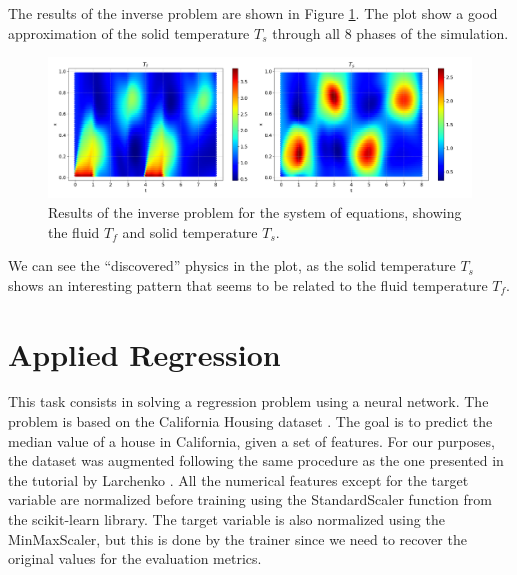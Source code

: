 \documentclass[unicode,11pt,a4paper,oneside,numbers=endperiod,openany]{scrartcl}
\begin{document}
The results of the inverse problem are shown in Figure \ref{fig:task2}. The plot
show a good approximation of the solid temperature $T_s$ through all 8 phases of
the simulation.
\begin{figure}[h]
    \centering
    \includegraphics[width=\textwidth]{../Proj1_Y24/Task2/output.png}
    \caption{Results of the inverse problem for the system of equations, showing the fluid  $T_f$ and solid temperature $T_s$.}
    \label{fig:task2}
\end{figure}
We can see the ``discovered'' physics in the plot, as the solid temperature
$T_s$
shows an interesting pattern that seems to be related to the fluid temperature
$T_f$.

\section{Applied Regression}\label{sec:task3}
This task consists in solving a regression problem using a neural network. The
problem is based on the California Housing dataset
\cite{wang_california_housing_1990}.
The goal is to predict the median value of a house in California, given
a set of features. 
For our purposes, the dataset was augmented following the same procedure as the
one presented in the tutorial
by Larchenko \cite{Larchenko2019}. 
All the numerical features except for the target
variable are normalized before training using the StandardScaler function from
the scikit-learn library. The target variable is also normalized using the
MinMaxScaler, but this is done by the trainer since we need to recover the
original values for the evaluation metrics.
\end{document}
